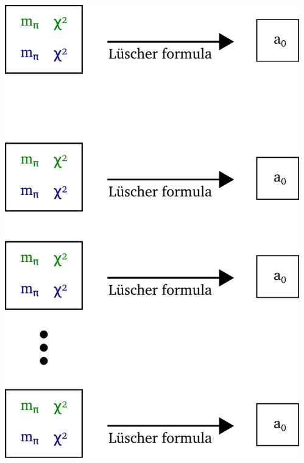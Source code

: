 \documentclass[english, fleqn]{beamer}
\begin{document}
\begin{frame}
\begin{columns}
\begin{column}{0.6\textwidth}
        \end{column}
        \begin{column}{0.4\textwidth}
            \begin{center}
                \includegraphics[scale=\scale]{sketches/07-luescher.pdf}
            \end{center}
        \end{column}
    \end{columns}
\end{frame}
\end{document}
